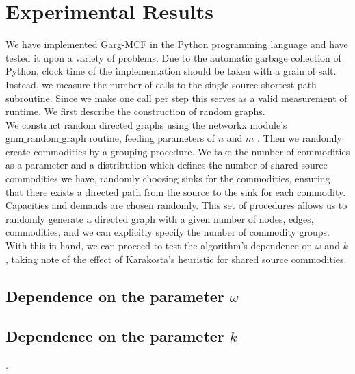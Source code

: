 \section{Experimental Results}

We have implemented Garg-MCF in the Python programming language and
have tested it upon a variety of problems. Due to the automatic
garbage collection of Python, clock time of the implementation should
be taken with a grain of salt. Instead, we measure the number of calls
to the single-source shortest path subroutine. Since we make one call
per step this serves as a valid measurement of runtime. We first
describe the construction of random graphs. \\
We construct random directed graphs using the networkx module's
$\mathrm{gnm\_random\_graph}$ routine, feeding parameters of $n$ and
$m$ \cite{networkx}. Then we randomly create commodities by a grouping
procedure. We take the number of commodities as a parameter and a
distribution which defines the number of shared source commodities we
have, randomly choosing sinks for the commodities, ensuring that there
exists a directed path from the source to the sink for each
commodity. Capacities and demands are chosen randomly. This set of
procedures allows us to randomly generate a directed graph with a
given number of nodes, edges, commodities, and we can explicitly specify the
number of commodity groups. With this in hand, we can proceed to test
the algorithm's dependence on $\omega$ and $k$, taking note of the
effect of Karakosta's heuristic for shared source commodities.
\subsection{Dependence on the parameter $\omega$}

\subsection{Dependence on the parameter $k$}.

